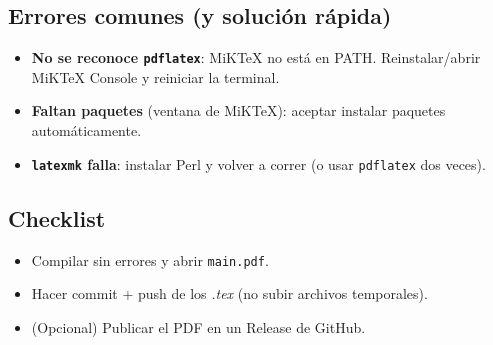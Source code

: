 \subsection*{Errores comunes (y solución rápida)}
\begin{itemize}
  \item \textbf{No se reconoce \texttt{pdflatex}}: MiKTeX no está en PATH. Reinstalar/abrir MiKTeX Console y reiniciar la terminal.
  \item \textbf{Faltan paquetes} (ventana de MiKTeX): aceptar instalar paquetes automáticamente.
  \item \textbf{\texttt{latexmk} falla}: instalar Perl y volver a correr (o usar \texttt{pdflatex} dos veces).
\end{itemize}

\subsection*{Checklist}
\begin{itemize}
  \item Compilar sin errores y abrir \texttt{main.pdf}.
  \item Hacer commit + push de los \textit{.tex} (no subir archivos temporales).
  \item (Opcional) Publicar el PDF en un Release de GitHub.
\end{itemize}
